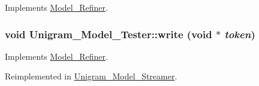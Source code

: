 Implements \hyperlink{class_model___refiner_a5766465773d95e73a36dac702cfe2298}{Model\_\-Refiner}.

\hypertarget{class_unigram___model___tester_a9f9538866008fd7dfd681faaf4562b74}{
\subsubsection[{write}]{\setlength{\rightskip}{0pt plus 5cm}void Unigram\_\-Model\_\-Tester::write (void $\ast$ {\em token})}}
\label{class_unigram___model___tester_a9f9538866008fd7dfd681faaf4562b74}


Implements \hyperlink{class_model___refiner_a7a98ac7633d5d15d959d9b9c1a414576}{Model\_\-Refiner}.



Reimplemented in \hyperlink{class_unigram___model___streamer_a236395088d23966ec59a85582e4d470f}{Unigram\_\-Model\_\-Streamer}.



